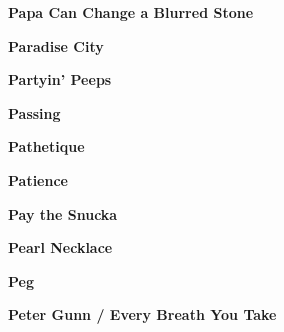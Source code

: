 \newline
\vspace{10pt} 
\begin{center}\textbf{Papa Can Change a Blurred Stone}\end{center}
\newline
\vspace{10pt} 
\begin{center}\textbf{Paradise City}\end{center}
\newline
\vspace{10pt} 
\begin{center}\textbf{Partyin' Peeps}\end{center}
\newline
\vspace{10pt} 
\begin{center}\textbf{Passing}\end{center}
\newline
\vspace{10pt} 
\begin{center}\textbf{Pathetique}\end{center}
\newline
\vspace{10pt} 
\begin{center}\textbf{Patience}\end{center}
\newline
\vspace{10pt} 
\begin{center}\textbf{Pay the Snucka}\end{center}
\newline
\vspace{10pt} 
\begin{center}\textbf{Pearl Necklace}\end{center}
\newline
\vspace{10pt} 
\begin{center}\textbf{Peg}\end{center}
\newline
\vspace{10pt} 
\begin{center}\textbf{Peter Gunn / Every Breath You Take}\end{center}
